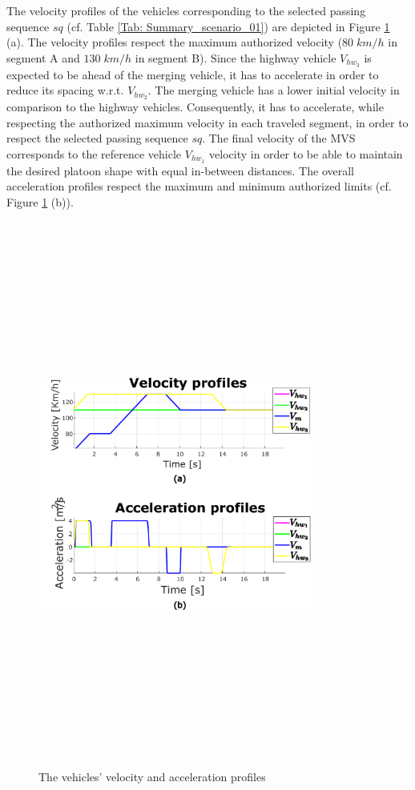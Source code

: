  The velocity profiles of the vehicles corresponding to the selected passing sequence $sq$ (cf. Table \ref{Tab: Summary_scenario_01}) are depicted in Figure \ref{fig:scenario01:formation_velocity} (a). The velocity profiles respect the maximum authorized velocity ($80 \; km/h$ in segment A and $130 \; km/h$ in segment B). Since the highway vehicle $V_{hw_3}$ is expected to be ahead of the merging vehicle, it has to accelerate in order to reduce its spacing w.r.t. $V_{hw_2}$. The merging vehicle has a lower initial velocity in comparison to the highway vehicles. Consequently, it has to accelerate, while respecting the authorized maximum velocity in each traveled segment, in order to respect the selected passing sequence $sq$. The final velocity of the MVS corresponds to the reference vehicle $V_{hw_1}$ velocity in order to be able to maintain the desired platoon shape with equal in-between distances. The overall acceleration profiles respect the maximum and minimum authorized limits (cf. Figure \ref{fig:scenario01:formation_velocity} (b)).
     \begin{figure}[!h]
        \centering 
        \includegraphics[width=9cm,height=18cm,keepaspectratio]{chapters/Chapitre_6/Figures/Scenario_1/Velocity.pdf}
        \caption{The vehicles' velocity and acceleration profiles}
        \label{fig:scenario01:formation_velocity}
        \end{figure}








